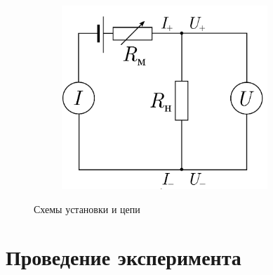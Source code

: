 \documentclass[14pt, a4paper]{report}
\begin{document}
\begin{figure}
\begin{subfigure}{.4\textwidth}
\includegraphics[width=1\linewidth]{terma6_01.png}
\end{subfigure}
\caption{Схемы установки и цепи}
\end{figure}

\section{Проведение эксперимента}
\end{document}
